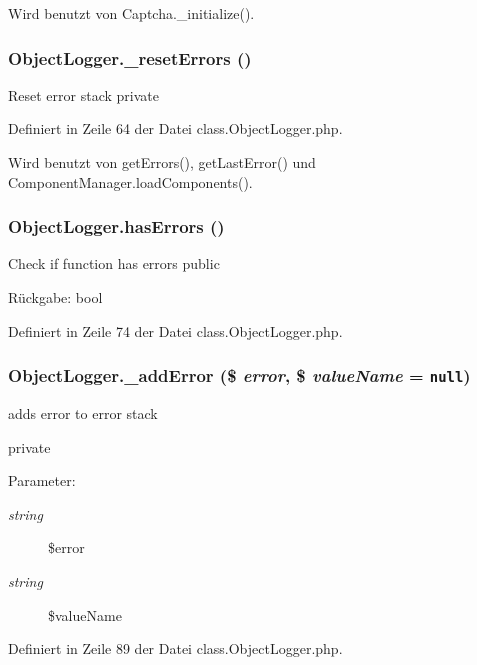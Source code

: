 Wird benutzt von Captcha.\_\-initialize().
\subsubsection{\setlength{\rightskip}{0pt plus 5cm}ObjectLogger.\_\-resetErrors ()}\label{classObjectLogger_3b306238378bb21cf09333e0ce691c0b}


Reset error stack  private 

Definiert in Zeile 64 der Datei class.ObjectLogger.php.

Wird benutzt von getErrors(), getLastError() und ComponentManager.loadComponents().
\subsubsection{\setlength{\rightskip}{0pt plus 5cm}ObjectLogger.hasErrors ()}\label{classObjectLogger_c8a2fbf95ac1aa972132dec5e4d5ee79}


Check if function has errors  public \begin{Desc}
\item[Rückgabe:]bool \end{Desc}


Definiert in Zeile 74 der Datei class.ObjectLogger.php.
\subsubsection{\setlength{\rightskip}{0pt plus 5cm}ObjectLogger.\_\-addError (\$ {\em error}, \$ {\em valueName} = {\tt null})}\label{classObjectLogger_80da39713b2275b8a78d4d9a3f43b34f}


adds error to error stack

private \begin{Desc}
\item[Parameter:]
\begin{description}
\item[{\em string}]\$error \item[{\em string}]\$valueName \end{description}
\end{Desc}


Definiert in Zeile 89 der Datei class.ObjectLogger.php.

